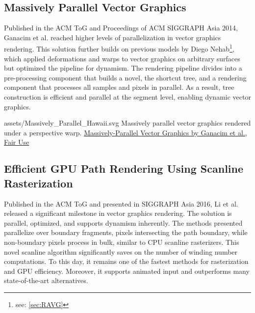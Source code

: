 \subsection{Massively Parallel Vector Graphics}
Published in the ACM ToG and Proceedings of ACM SIGGRAPH Asia 2014, Ganacim et al. reached higher levels of parallelization in vector graphics rendering. This solution further builds on previous models by Diego Nehab\footnote{see: \cref{sec:RAVG}}, which applied deformations and warps to vector graphics on arbitrary surfaces but optimized the pipeline for dynamism. The rendering pipeline divides into a pre-processing component that builds a novel, the shortcut tree, and a rendering component that processes all samples and pixels in parallel\cite{Ganacim14}. As a result, tree construction is efficient and parallel at the segment level, enabling dynamic vector graphics.

\widesvg
{assets/Massively_Parallel_Hawaii.svg}
{Massively parallel vector graphics rendered under a perspective warp.}
{\href{https://w3.impa.br/~diego/projects/GanEtAl14/index.html}{Massively-Parallel Vector Graphics by Ganacim et al., Fair Use}}\medskip

\subsection{Efficient GPU Path Rendering Using Scanline Rasterization}\label{sec:scanline_vg}
Published in the ACM ToG and presented in SIGGRAPH Asia 2016, Li et al. released a significant milestone in vector graphics rendering. The solution is parallel, optimized, and supports dynamism inherently. The methods presented parallelize over boundary fragments, pixels intersecting the path boundary, while non-boundary pixels process in bulk, similar to CPU scanline rasterizers\cite{Li16}. This novel scanline algorithm significantly saves on the number of winding number computations. To this day, it remains one of the fastest methods for rasterization and GPU efficiency. Moreover, it supports animated input and outperforms many state-of-the-art alternatives.

